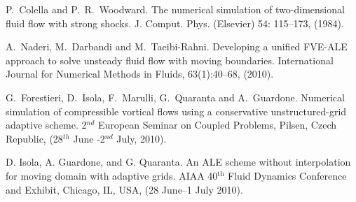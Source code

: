 
\begin{thebibliography}{10}
{\sc P.~Colella and P.~R.~Woodward}. {The numerical simulation of two-dimensional fluid flow with strong shocks}. J. Comput. Phys. (Elsevier) 54: 115--173, (1984).
	
{\sc A.~Naderi, M.~Darbandi and M.~Taeibi-Rahni}. {Developing a unified FVE-ALE approach to solve unsteady fluid flow with moving boundaries}. {International Journal for Numerical Methods in Fluids, 63(1):40--68, (2010).}
	
{\sc G.~Forestieri, D.~Isola, F.~Marulli, G.~Quaranta and A.~Guardone}. {Numerical simulation of compressible vortical flows using a conservative unstructured-grid adaptive scheme}. 2$^{nd}$ European Seminar on Coupled Problems, Pilsen, Czech Republic, (28$^{th}$ June -2$^{nd}$ July, 2010).
	
{\sc D. Isola, A. Guardone, and G. Quaranta}. {An {ALE} scheme without interpolation for moving domain with adaptive grids}. AIAA 40\ensuremath{^{\textrm{th}}} Fluid Dynamics Conference and Exhibit, Chicago, IL, USA, (28 June--1 July 2010).
\end{thebibliography}
